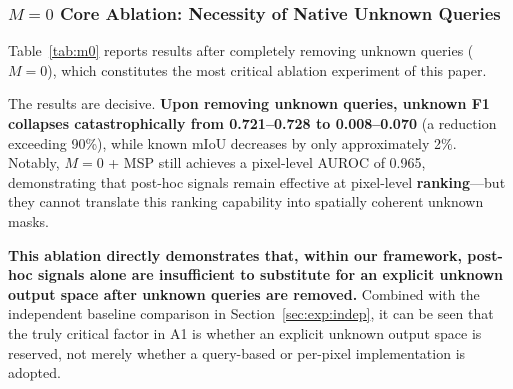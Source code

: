 \documentclass[3p,twocolumn,authoryear]{elsarticle}
\begin{document}
\subsubsection{$M=0$ Core Ablation: Necessity of Native Unknown Queries}\label{sec:exp:ablation:m0}

Table~\ref{tab:m0} reports results after completely removing unknown queries ($M=0$),
which constitutes the most critical ablation experiment of this paper.

\begin{table}[t]
\centering
\footnotesize
\setlength{\tabcolsep}{3pt}
\caption{$M=0$ ablation: can post-hoc signals substitute for structured abstention
after removing native unknown queries?
Synapse A1 protocol. `\texttt{---}' indicates the metric is not applicable or not
reported for that setting.}\label{tab:m0}
\end{table}

The results are decisive.
\textbf{Upon removing unknown queries, unknown F1 collapses catastrophically from
0.721--0.728 to 0.008--0.070} (a reduction exceeding 90\%), while known mIoU
decreases by only approximately 2\%.
Notably, $M=0$ + MSP still achieves a pixel-level AUROC of 0.965, demonstrating
that post-hoc signals remain effective at pixel-level \textbf{ranking}---but they
cannot translate this ranking capability into spatially coherent unknown masks.

\textbf{This ablation directly demonstrates that, within our framework, post-hoc
signals alone are insufficient to substitute for an explicit unknown output space
after unknown queries are removed.}
Combined with the independent baseline comparison in Section~\ref{sec:exp:indep},
it can be seen that the truly critical factor in A1 is whether an explicit unknown
output space is reserved, not merely whether a query-based or per-pixel implementation
is adopted.
\end{document}
